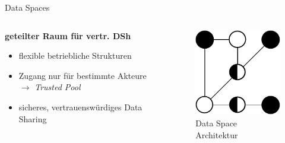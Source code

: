 \begin{frame}{Data Spaces \footnotesize\cite{mollerIndustrialDataEcosystems2024}}
\begin{columns}
\begin{column}{0.6\textwidth}
\begin{itemize}
{                    \textbf{geteilter Raum für vertr. DSh}
                    \begin{itemize}
                        \item flexible betriebliche Strukturen
                        \item Zugang nur für bestimmte Akteure $\to$ \emph{Trusted Pool}
                        \item sicheres, vertrauenswürdiges Data Sharing
                    \end{itemize}
                }
            \end{itemize}
        \end{column}
        
        \begin{column}{0.4\textwidth}
            \begin{figure}
                \includegraphics[height=0.5\textheight]{./assets/data_space_architecture.drawio.pdf}
                \caption{Data Space Architektur}
            \end{figure}
        \end{column}
    \end{columns}
\end{frame}


